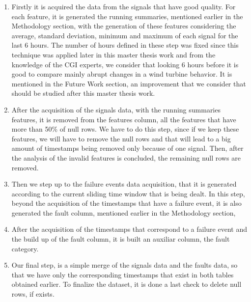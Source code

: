 \begin{enumerate}
    \item 
Firstly it is acquired the data from the signals that have good quality. For each feature, it is generated the running summaries, mentioned earlier in the Methodology section, with the generation of these features considering the average, standard deviation, minimum and maximum of each signal for the last 6 hours.
The number of hours defined in these step was fixed since this technique was applied later in this master thesis work and from the knowledge of the CGI experts, we consider that looking 6 hours before it is good to compare mainly abrupt changes in a wind turbine behavior.
It is mentioned in the Future Work section, an improvement that we consider that should be studied after this master thesis work.

    \item
After the acquisition of the signals data, with the running summaries features, it is removed from the features column, all the features that have more than 50\% of null rows. We have to do this step, since if we keep these features, we will have to remove the null rows and that will lead to a big amount of timestamps being removed only because of one signal.
Then, after the analysis of the invalid features is concluded, the remaining null rows are removed.

    \item
Then we step up to the failure events data acquisition, that it is generated according to the current sliding time window that is being dealt. In this step, beyond the acquisition of the timestamps that have a failure event, it is also generated the fault column, mentioned earlier in the Methodology section,

    \item
After the acquisition of the timestamps that correspond to a failure event and the build up of the fault column, it is built an auxiliar column, the fault category.

    \item
Our final step, is a simple merge of the signals data and the faults data, so that we have only the corresponding timestamps that exist in both tables obtained earlier. To finalize the dataset, it is done a last check to delete null rows, if exists.

\end{enumerate}


